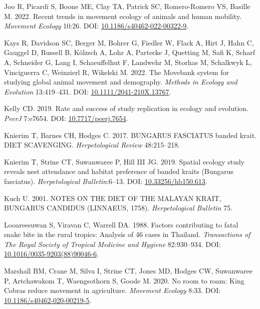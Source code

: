 \documentclass[10pt,a4paper]{article}
\newlength{\cslhangindent}
\newenvironment{CSLReferences}[2] %
 {\begin{list}{}{%
  \setlength{\itemindent}{0pt}
  \setlength{\leftmargin}{0pt}
  \setlength{\parsep}{0pt}
  \ifodd #1
   \setlength{\leftmargin}{\cslhangindent}
   \setlength{\itemindent}{-1\cslhangindent}
  \fi
  \setlength{\itemsep}{#2\baselineskip}}}
 {\end{list}}
\begin{document}
\begin{CSLReferences}{1}{0}
Joo R, Picardi S, Boone ME, Clay TA, Patrick SC, Romero-Romero VS, Basille M. 2022. Recent trends in movement ecology of animals and human mobility. \emph{Movement Ecology} 10:26. DOI: \href{https://doi.org/10.1186/s40462-022-00322-9}{10.1186/s40462-022-00322-9}.

Kays R, Davidson SC, Berger M, Bohrer G, Fiedler W, Flack A, Hirt J, Hahn C, Gauggel D, Russell B, Kölzsch A, Lohr A, Partecke J, Quetting M, Safi K, Scharf A, Schneider G, Lang I, Schaeuffelhut F, Landwehr M, Storhas M, Schalkwyk L, Vinciguerra C, Weinzierl R, Wikelski M. 2022. The {Movebank} system for studying global animal movement and demography. \emph{Methods in Ecology and Evolution} 13:419--431. DOI: \href{https://doi.org/10.1111/2041-210X.13767}{10.1111/2041-210X.13767}.

Kelly CD. 2019. Rate and success of study replication in ecology and evolution. \emph{PeerJ} 7:e7654. DOI: \href{https://doi.org/10.7717/peerj.7654}{10.7717/peerj.7654}.

Knierim T, Barnes CH, Hodges C. 2017. BUNGARUS FASCIATUS banded krait. DIET SCAVENGING. \emph{Herpetological Review} 48:215--218.

Knierim T, Strine CT, Suwanwaree P, Hill III JG. 2019. Spatial ecology study reveals nest attendance and habitat preference of banded kraits ({Bungarus} fasciatus). \emph{Herpetological Bulletin}:6--13. DOI: \href{https://doi.org/10.33256/hb150.613}{10.33256/hb150.613}.

Kuch U. 2001. {NOTES} {ON} {THE} {DIET} {OF} {THE} {MALAYAN} {KRAIT}, {BUNGARUS} {CANDIDUS} ({LINNAEUS}, 1758). \emph{Herpetological Bulletin} 75.

Looareesuwan S, Viravan C, Warrell DA. 1988. Factors contributing to fatal snake bite in the rural tropics: Analysis of 46 cases in {Thailand}. \emph{Transactions of The Royal Society of Tropical Medicine and Hygiene} 82:930--934. DOI: \href{https://doi.org/10.1016/0035-9203(88)90046-6}{10.1016/0035-9203(88)90046-6}.

Marshall BM, Crane M, Silva I, Strine CT, Jones MD, Hodges CW, Suwanwaree P, Artchawakom T, Waengsothorn S, Goode M. 2020. No room to roam: {King} {Cobras} reduce movement in agriculture. \emph{Movement Ecology} 8:33. DOI: \href{https://doi.org/10.1186/s40462-020-00219-5}{10.1186/s40462-020-00219-5}.


\end{CSLReferences}
\end{document}
